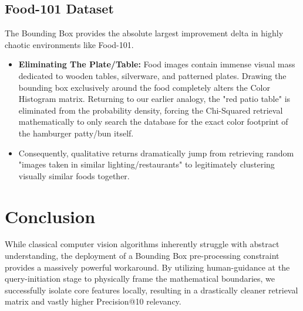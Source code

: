\documentclass[11pt, a4paper]{article}
\begin{document}
\subsection{Food-101 Dataset}
The Bounding Box provides the absolute largest improvement delta in highly chaotic environments like Food-101.
\begin{itemize}
    \item \textbf{Eliminating The Plate/Table:} Food images contain immense visual mass dedicated to wooden tables, silverware, and patterned plates. Drawing the bounding box exclusively around the food completely alters the Color Histogram matrix. Returning to our earlier analogy, the "red patio table" is eliminated from the probability density, forcing the Chi-Squared retrieval mathematically to only search the database for the exact color footprint of the hamburger patty/bun itself.
    \item Consequently, qualitative returns dramatically jump from retrieving random "images taken in similar lighting/restaurants" to legitimately clustering visually similar foods together.
\end{itemize}

\section{Conclusion}
While classical computer vision algorithms inherently struggle with abstract understanding, the deployment of a Bounding Box pre-processing constraint provides a massively powerful workaround. By utilizing human-guidance at the query-initiation stage to physically frame the mathematical boundaries, we successfully isolate core features locally, resulting in a drastically cleaner retrieval matrix and vastly higher Precision@10 relevancy.
\end{document}

